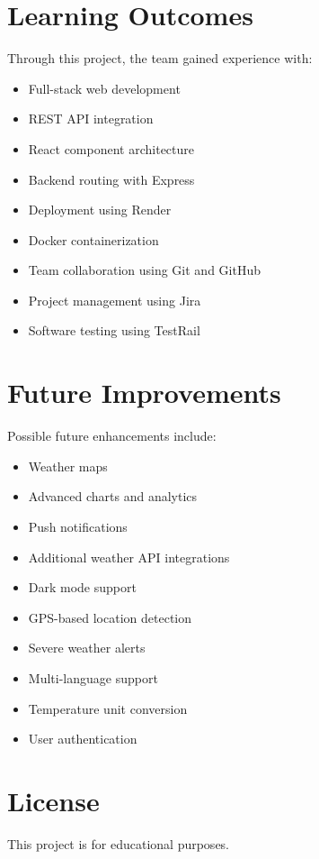 \documentclass{article}
\begin{document}
\section{Learning Outcomes}

Through this project, the team gained experience with:

\begin{itemize}[leftmargin=*]
    \item Full-stack web development
    \item REST API integration
    \item React component architecture
    \item Backend routing with Express
    \item Deployment using Render
    \item Docker containerization
    \item Team collaboration using Git and GitHub
    \item Project management using Jira
    \item Software testing using TestRail
\end{itemize}

\section{Future Improvements}

Possible future enhancements include:

\begin{itemize}[leftmargin=*]
    \item Weather maps
    \item Advanced charts and analytics
    \item Push notifications
    \item Additional weather API integrations
    \item Dark mode support
    \item GPS-based location detection
    \item Severe weather alerts
    \item Multi-language support
    \item Temperature unit conversion
    \item User authentication
\end{itemize}

\section{License}

This project is for educational purposes.
\end{document}
